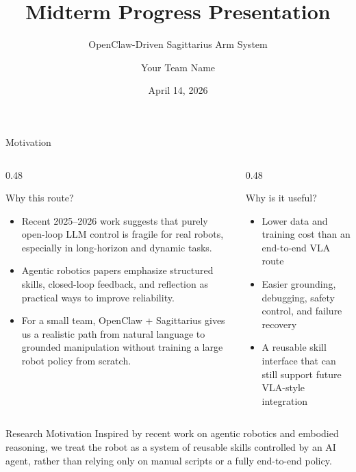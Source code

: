 \documentclass[aspectratio=169]{beamer}
\title{Midterm Progress Presentation}
\subtitle{OpenClaw-Driven Sagittarius Arm System}
\author{Your Team Name}
\date{April 14, 2026}
\begin{document}
\begin{frame}
  \titlepage
\end{frame}

\begin{frame}{Motivation}
  \begin{columns}[T]
    \begin{column}{0.48\textwidth}
      \begin{block}{Why this route?}
        \begin{itemize}
          \item Recent 2025--2026 work suggests that purely open-loop LLM control is fragile for real robots, especially in long-horizon and dynamic tasks.
          \item Agentic robotics papers emphasize structured skills, closed-loop feedback, and reflection as practical ways to improve reliability.
          \item For a small team, OpenClaw + Sagittarius gives us a realistic path from natural language to grounded manipulation without training a large robot policy from scratch.
        \end{itemize}
      \end{block}
    \end{column}
    \begin{column}{0.48\textwidth}
      \begin{block}{Why is it useful?}
        \begin{itemize}
          \item Lower data and training cost than an end-to-end VLA route
          \item Easier grounding, debugging, safety control, and failure recovery
          \item A reusable skill interface that can still support future VLA-style integration
        \end{itemize}
      \end{block}
    \end{column}
  \end{columns}

  \vspace{0.5em}

  \begin{block}{Research Motivation}
    Inspired by recent work on agentic robotics and embodied reasoning, we treat the robot as a system of reusable skills controlled by an AI agent, rather than relying only on manual scripts or a fully end-to-end policy.
  \end{block}
\end{frame}
\end{document}
